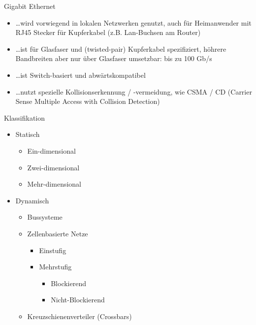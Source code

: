 \begin{defi}{Gigabit Ethernet}
    \begin{itemize}
        \item \ldots wird vorwiegend in lokalen Netzwerken genutzt,
              auch für Heimanwender mit RJ45 Stecker für Kupferkabel (z.B. Lan-Buchsen am Router)
        \item \ldots ist für Glasfaser und (twisted-pair) Kupferkabel spezifiziert,
              höhrere Bandbreiten aber nur über Glasfaser umsetzbar: bis zu 100 Gb/s
        \item \ldots ist Switch-basiert und abwärtskompatibel
        \item \ldots nutzt spezielle Kollisionserkennung / -vermeidung,
              wie CSMA / CD (Carrier Sense Multiple Access with Collision Detection)
    \end{itemize}
\end{defi}

\begin{defi}[Verbindungsnetzwerk]{Klassifikation}
    \begin{itemize}
        \item Statisch
              \begin{itemize}
                  \item Ein-dimensional
                  \item Zwei-dimensional
                  \item Mehr-dimensional
              \end{itemize}
        \item Dynamisch
              \begin{itemize}
                  \item Bussysteme
                  \item Zellenbasierte Netze
                        \begin{itemize}
                            \item Einstufig
                            \item Mehrstufig
                                  \begin{itemize}
                                      \item Blockierend
                                      \item Nicht-Blockierend
                                  \end{itemize}
                        \end{itemize}
                  \item Kreuzschienenverteiler (Crossbars)
              \end{itemize}
    \end{itemize}
\end{defi}

